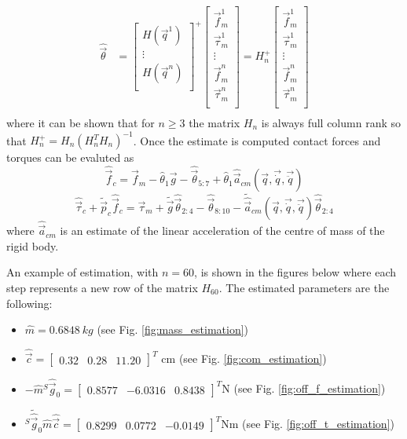 \[
\begin{split}
  \hat{\vec{\theta}} &=
  \begin{bmatrix}
    H(\vec{q}^{1})\\
    \vdots \\
    H(\vec{q}^{n})\\
  \end{bmatrix}^{+}
  \begin{bmatrix}
    \vec{f}_{m}^{1} \\
    \vec{\tau}_{m}^{1} \\
    \vdots \\
    \vec{f}_{m}^{n} \\
    \vec{\tau}_{m}^{n} \\
  \end{bmatrix}
  =
  H_n^{+}
  \begin{bmatrix}
    \vec{f}_{m}^{1} \\
    \vec{\tau}_{m}^{1} \\
    \vdots \\
    \vec{f}_{m}^{n} \\
    \vec{\tau}_{m}^{n} \\
  \end{bmatrix}\\
\end{split}
\]
where it can be shown that for $n \ge 3$ the matrix $H_n$ is always full column rank
so that $H_n^{+} = H_n(H_n^{T} H_n)^{-1}$.
Once the estimate is computed contact forces and torques can be evaluted as
\[
\hat{\vec{f}}_c = \vec{f}_m - \hat{\theta}_{1} \vec{g} - \hat{\vec{\theta}}_{5:7} + \hat{\theta}_{1} \hat{\vec{a}}_{cm}(\vec{q},\vec{\dot{q}},\vec{\ddot{q}})
\]
\[
\hat{\vec{\tau}}_c + \tilde{\vec{p}}_c  \hat{\vec{f}}_c = \vec{\tau}_m + \tilde{\vec{g}} \hat{\vec{\theta}}_{2:4} - \hat{\vec{\theta}}_{8:10} - \tilde{\hat{\vec{a}}}_{cm}(\vec{q},\vec{\dot{q}},\vec{\ddot{q}}) \hat{\vec{\theta}}_{2:4}
\]
where $\hat{\vec{a}}_{cm}$ is an estimate of the linear acceleration of the centre of mass of the rigid body.
\par
An example of estimation, with $n=60$, is shown in the figures below where each step represents a new row of the
matrix $H_{60}$. The estimated parameters are the following:
\begin{itemize}
\item $\hat{m} = \SI{0.6848}{kg}$ (see Fig. \ref{fig:mass_estimation})
\item $\hat{\vec{c}} =
  \begin{bmatrix}
    0.32 & 0.28 & 11.20
  \end{bmatrix}^T$ cm  (see Fig. \ref{fig:com_estimation})
\item $-\hat{m} {}^S \hat{\vec{g}}_{0} =
  \begin{bmatrix}
    0.8577 & -6.0316 & 0.8438 
  \end{bmatrix}^T
  $N  (see Fig. \ref{fig:off_f_estimation})
\item ${}^S \tilde{\hat{\vec{g}}}_{0} \hat{m}\hat{\vec{c}} =
  \begin{bmatrix}
    0.8299 & 0.0772 & -0.0149  
  \end{bmatrix}^T
  $Nm  (see Fig. \ref{fig:off_t_estimation})
\end{itemize}
